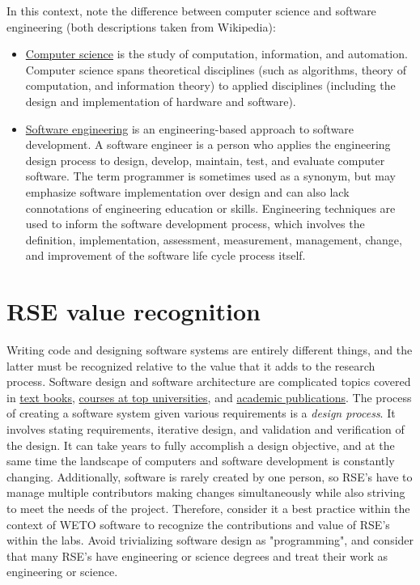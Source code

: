\documentclass[]{nrel}
\begin{document}
\begin{appendices}
In this context, note the difference between computer science and software engineering (both
descriptions taken from Wikipedia):
\begin{itemize}
\item \href{https://en.wikipedia.org/wiki/Computer_science}{Computer science} is the study of
    computation, information, and automation.
    Computer science spans theoretical disciplines (such as algorithms, theory of computation,
    and information theory) to applied disciplines (including the design and implementation of
    hardware and software).
    
\item \href{https://en.wikipedia.org/wiki/Software_engineering}{Software engineering} is an
    engineering-based approach to software development. A software
    engineer is a person who applies the engineering design process to design, develop, maintain,
    test, and evaluate computer software. The term programmer is sometimes used as a synonym,
    but may emphasize software implementation over design and can also lack connotations of
    engineering education or skills.
    Engineering techniques are used to inform the software development process, which involves the
    definition, implementation, assessment, measurement, management, change, and improvement of
    the software life cycle process itself.
\end{itemize}

\section{RSE value recognition}
Writing code and designing software systems are entirely different things, and the latter
must be recognized relative to the value that it adds to the research process.
Software design and software architecture are complicated topics covered in
\href{https://www.amazon.com/s?k=software+design&i=stripbooks&crid=2L9GNOIMWHMFD&sprefix=software+design%2Cstripbooks%2C166&ref=nb_sb_noss_2}{text books},
\href{https://web.stanford.edu/~ouster/cs190-winter23/}{courses at top universities}, and
\href{https://www.researchgate.net/search.Search.html?query=software+architecture&type=publication&subfilter%5BpublicationType%5D=article%2Fbook&subfilter%5BstartYear%5D=2022}{academic publications}.
The process of creating a software system given various requirements is a \textit{design process}.
It involves stating requirements, iterative design, and validation and verification of the design.
It can take years to fully accomplish a design objective, and at the same time the landscape of
computers and software development is constantly changing.
Additionally, software is rarely created by one person, so RSE's have to manage multiple
contributors making changes simultaneously while also striving to meet the needs of the project.
Therefore, consider it a best practice within the context of WETO software to recognize
the contributions and value of RSE's within the labs.
Avoid trivializing software design as "programming", and consider that many RSE's have engineering
or science degrees and treat their work as engineering or science.


\end{appendices}
\end{document}
